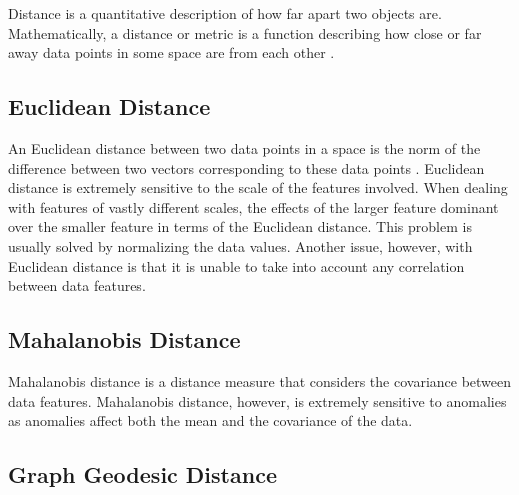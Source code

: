 Distance is a quantitative description of how far apart two objects are.
Mathematically, a distance or metric is a function describing how close or far
away data points in some space are from each other \cite{Khoa:2012}.

\subsection{Euclidean Distance}
\label{distance:euclidian}
An Euclidean distance between two data points in a space is the norm of the
difference between two vectors corresponding to these data points
\cite{Khoa:2012}. Euclidean distance is extremely sensitive to the scale of the
features involved. When dealing with features of vastly different scales, the
effects of the larger feature dominant over the smaller feature in terms of the
Euclidean distance. This problem is usually solved by normalizing the data
values. Another issue, however, with Euclidean distance is that it is unable to
take into account any correlation between data features.

\subsection{Mahalanobis Distance}
\label{distance:mahalanobis}
Mahalanobis distance is a distance measure that considers the covariance between
data features. Mahalanobis distance, however, is extremely sensitive to
anomalies as anomalies affect both the mean and the covariance of the data.

\subsection{Graph Geodesic Distance}
\label{distance:graphGeodesic}
